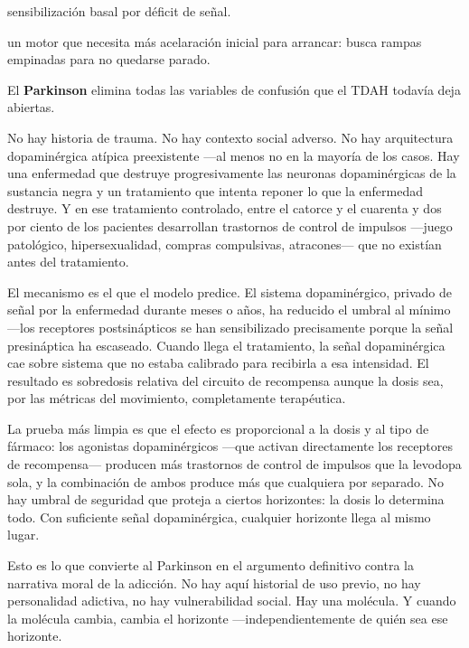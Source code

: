\begin{fisica}
 sensibilización basal por déficit de señal.

 un motor que necesita más acelaración inicial para arrancar: busca rampas empinadas para no quedarse parado.
\end{fisica}
\noindent El \textbf{Parkinson} elimina todas las variables de confusión que el TDAH todavía deja abiertas.

No hay historia de trauma. No hay contexto social adverso. No hay arquitectura dopaminérgica atípica preexistente —al menos no en la mayoría de los casos. Hay una enfermedad que destruye progresivamente las neuronas dopaminérgicas de la sustancia negra y un tratamiento que intenta reponer lo que la enfermedad destruye. Y en ese tratamiento controlado, entre el catorce y el cuarenta y dos por ciento de los pacientes desarrollan trastornos de control de impulsos —juego patológico, hipersexualidad, compras compulsivas, atracones— que no existían antes del tratamiento.

El mecanismo es el que el modelo predice. El sistema dopaminérgico, privado de señal por la enfermedad durante meses o años, ha reducido el umbral al mínimo —los receptores postsinápticos se han sensibilizado precisamente porque la señal presináptica ha escaseado. Cuando llega el tratamiento, la señal dopaminérgica cae sobre sistema que no estaba calibrado para recibirla a esa intensidad. El resultado es sobredosis relativa del circuito de recompensa aunque la dosis sea, por las métricas del movimiento, completamente terapéutica.

La prueba más limpia es que el efecto es proporcional a la dosis y al tipo de fármaco: los agonistas dopaminérgicos —que activan directamente los receptores de recompensa— producen más trastornos de control de impulsos que la levodopa sola, y la combinación de ambos produce más que cualquiera por separado. No hay umbral de seguridad que proteja a ciertos horizontes: la dosis lo determina todo. Con suficiente señal dopaminérgica, cualquier horizonte llega al mismo lugar.

Esto es lo que convierte al Parkinson en el argumento definitivo contra la narrativa moral de la adicción. No hay aquí historial de uso previo, no hay personalidad adictiva, no hay vulnerabilidad social. Hay una molécula. Y cuando la molécula cambia, cambia el horizonte —independientemente de quién sea ese horizonte.

